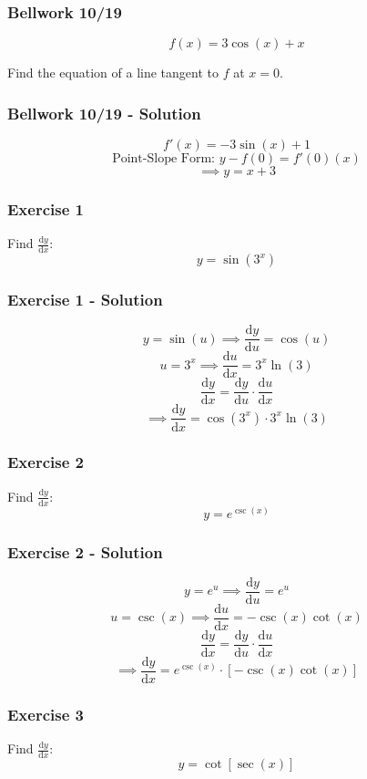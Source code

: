 \documentclass[12pt]{beamer}
\begin{document}
\begin{frame}
	\frametitle{Bellwork 10/19}
	\initclock

	\vfill
	\vfill
	\vfill
	\Large
	\[f(x)=3\cos(x)+x\]
	\vfill
	\begin{center}
		Find the equation of a line tangent to $f$ at $x = 0$.
	\end{center}
	\vfill
	\vfill
	\vfill
	\vfill

	\small
	\crono
\end{frame}
\begin{frame}
	\frametitle{Bellwork 10/19 - Solution}

	\Large
	\[f'(x)=-3\sin(x)+1\]
	\vfill
	\[\text{Point-Slope Form: }y-f(0)=f'(0)(x)\]
	\[\implies \boxed{y=x+3}\]
\end{frame}
\begin{frame}
	\frametitle{Exercise 1}

	\vfill
	\LARGE
	Find $\frac{\mathrm{d}y}{\mathrm{d}x}$:
	\vfill
	\[y=\sin(3^x)\]
	\vfill
	\vfill
	\vfill
\end{frame}
\begin{frame}
	\frametitle{Exercise 1 - Solution}

	\[y=\sin(u)\implies \frac{\mathrm{d}y}{\mathrm{d}u}=\cos(u)\]
	\[u=3^x\implies \frac{\mathrm{d}u}{\mathrm{d}x}=3^x\ln(3)\]
	\vfill
	\large
	\[\frac{\mathrm{d}y}{\mathrm{d}x}=\frac{\mathrm{d}y}{\mathrm{d}u}\cdot \frac{\mathrm{d}u}{\mathrm{d}x}\]
	\vfill
	\[\implies \boxed{\frac{\mathrm{d}y}{\mathrm{d}x}=\cos(3^x)\cdot 3^x\ln(3)}\]
\end{frame}
\begin{frame}
	\frametitle{Exercise 2}

	\vfill
	\LARGE
	Find $\frac{\mathrm{d}y}{\mathrm{d}x}$:
	\vfill
	\[y=e^{\csc(x)}\]
	\vfill
	\vfill
	\vfill
\end{frame}
\begin{frame}
	\frametitle{Exercise 2 - Solution}

	\[y=e^u\implies \frac{\mathrm{d}y}{\mathrm{d}u}=e^u\]
	\[u=\csc(x)\implies \frac{\mathrm{d}u}{\mathrm{d}x}=-\csc(x)\cot(x)\]
	\vfill
	\large
	\[\frac{\mathrm{d}y}{\mathrm{d}x}=\frac{\mathrm{d}y}{\mathrm{d}u}\cdot \frac{\mathrm{d}u}{\mathrm{d}x}\]
	\vfill
	\[\implies \boxed{\frac{\mathrm{d}y}{\mathrm{d}x}=e^{\csc(x)}\cdot [-\csc(x)\cot(x)]}\]
\end{frame}
\begin{frame}
	\frametitle{Exercise 3}

	\vfill
	\LARGE
	Find $\frac{\mathrm{d}y}{\mathrm{d}x}$:
	\vfill
	\[y=\cot[\sec(x)]\]
	\vfill
	\vfill
	\vfill
\end{frame}
\end{document}
